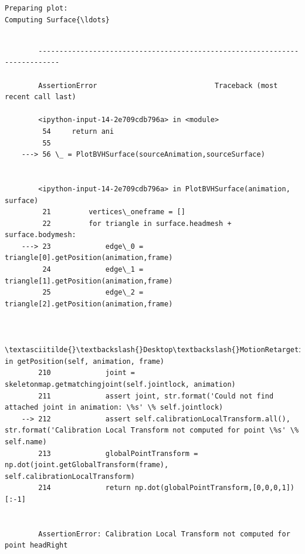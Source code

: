\documentclass{vgtc}
\begin{document}
    \begin{Verbatim}[commandchars=\\\{\}]
Preparing plot:
Computing Surface{\ldots}
\end{Verbatim}

    \begin{Verbatim}[commandchars=\\\{\}]

        ---------------------------------------------------------------------------

        AssertionError                            Traceback (most recent call last)

        <ipython-input-14-2e709cdb796a> in <module>
         54     return ani
         55 
    ---> 56 \_ = PlotBVHSurface(sourceAnimation,sourceSurface)
    

        <ipython-input-14-2e709cdb796a> in PlotBVHSurface(animation, surface)
         21         vertices\_oneframe = []
         22         for triangle in surface.headmesh + surface.bodymesh:
    ---> 23             edge\_0 = triangle[0].getPosition(animation,frame)
         24             edge\_1 = triangle[1].getPosition(animation,frame)
         25             edge\_2 = triangle[2].getPosition(animation,frame)
    

        \textasciitilde{}\textbackslash{}Desktop\textbackslash{}MotionRetargeting\textbackslash{}dev\textbackslash{}surface.py in getPosition(self, animation, frame)
        210             joint = skeletonmap.getmatchingjoint(self.jointlock, animation)
        211             assert joint, str.format('Could not find attached joint in animation: \%s' \% self.jointlock)
    --> 212             assert self.calibrationLocalTransform.all(), str.format('Calibration Local Transform not computed for point \%s' \% self.name)
        213             globalPointTransform = np.dot(joint.getGlobalTransform(frame), self.calibrationLocalTransform)
        214             return np.dot(globalPointTransform,[0,0,0,1])[:-1]
    

        AssertionError: Calibration Local Transform not computed for point headRight

    \end{Verbatim}

    \begin{figure}
        \begin{center}\end{center}
        \caption{}
        \label{}
    \end{figure}
    
\end{document}
